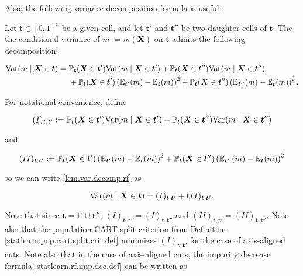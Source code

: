 Also, the following variance decomposition formula is useful:

\begin{lemma}

Let \(\boldsymbol{t} \in [0,1]^p\) be a given cell, and let \(\boldsymbol{t}'\) and \(\boldsymbol{t}''\) be two daughter cells of \(\boldsymbol{t}\). The the conditional variance of \(m := m(\boldsymbol{X})\) on \(\boldsymbol{t}\) admits the following decomposition:

\begin{align}
\mathrm{Var}(m \mid \boldsymbol{X} \in \boldsymbol{t}) = ~& \mathbb{P}_{\boldsymbol{t}}( \boldsymbol{X} \in \boldsymbol{t}') \mathrm{Var}( m \mid \boldsymbol{X} \in \boldsymbol{t}') +  \mathbb{P}_{\boldsymbol{t}}( \boldsymbol{X} \in \boldsymbol{t}'') \mathrm{Var}( m \mid \boldsymbol{X} \in \boldsymbol{t}'') \nonumber
\\   & + \mathbb{P}_{\boldsymbol{t}}( \boldsymbol{X} \in \boldsymbol{t}')\left(\mathbb{E}_{\boldsymbol{t}'}(m) -  \mathbb{E}_{\boldsymbol{t}}(m)  \right)^2 +    \mathbb{P}_{\boldsymbol{t}}( \boldsymbol{X} \in \boldsymbol{t}'')\left(\mathbb{E}_{\boldsymbol{t}''}(m) -  \mathbb{E}_{\boldsymbol{t}}(m)  \right)^2. \label{lem.var.decomp.rf}
\end{align}

\end{lemma}

For notational convenience, define

\[
(I)_{\boldsymbol{t}, \boldsymbol{t}'} := \mathbb{P}_{\boldsymbol{t}}( \boldsymbol{X} \in \boldsymbol{t}') \mathrm{Var}( m \mid \boldsymbol{X} \in \boldsymbol{t}') +  \mathbb{P}_{\boldsymbol{t}}( \boldsymbol{X} \in \boldsymbol{t}'') \mathrm{Var}( m \mid \boldsymbol{X} \in \boldsymbol{t}'') 
\]

and

\[
(II)_{\boldsymbol{t}, \boldsymbol{t}'} :=\mathbb{P}_{\boldsymbol{t}}( \boldsymbol{X} \in \boldsymbol{t}')\left(\mathbb{E}_{\boldsymbol{t}'}(m) -  \mathbb{E}_{\boldsymbol{t}}(m)  \right)^2 +    \mathbb{P}_{\boldsymbol{t}}( \boldsymbol{X} \in \boldsymbol{t}'')\left(\mathbb{E}_{\boldsymbol{t}''}(m) -  \mathbb{E}_{\boldsymbol{t}}(m)  \right)^2
\]

so we can write \eqref{lem.var.decomp.rf} as

\[
\mathrm{Var}(m \mid \boldsymbol{X} \in \boldsymbol{t}) = (I)_{\boldsymbol{t}, \boldsymbol{t}'}  +(II)_{\boldsymbol{t}, \boldsymbol{t}'}. 
\]

Note that since \(\boldsymbol{t} = \boldsymbol{t}' \cup \boldsymbol{t}''\), \((I)_{\boldsymbol{t}, \boldsymbol{t}'} = (I)_{\boldsymbol{t}, \boldsymbol{t}''}\) and \((II)_{\boldsymbol{t}, \boldsymbol{t}'}  = (II)_{\boldsymbol{t}, \boldsymbol{t}''} \). Note also that the population CART-split criterion from Definition \ref{statlearn.pop.cart.split.crit.def} minimizes \((I)_{\boldsymbol{t}, \boldsymbol{t}'} \) for the case of axis-aligned cuts. Note also that in the case of axis-aligned cuts, the impurity decrease formula \eqref{statlearn.rf.imp.dec.def} can be written as

